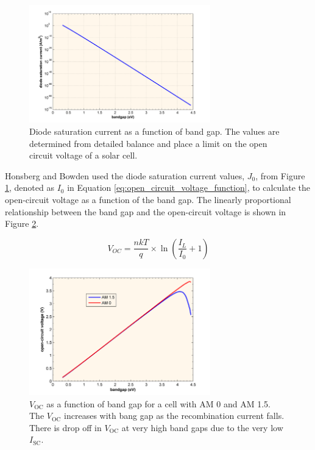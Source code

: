 \begin{figure}[ht]
    \centering
    \includegraphics[width=0.7\textwidth]{Figures/diode_saturation_current_bandgap_graph.png}
    \caption{Diode saturation current as a function of band gap. The values are determined from detailed balance and place a limit on the open circuit voltage of a solar cell. \cite{HonsbergOpen-CircuitVoltage}}
    \label{fig:diode_saturation_current_bandgap_graph}
\end{figure}
\FloatBarrier

Honsberg and Bowden used the diode saturation current values, $J_0$, from Figure \ref{fig:diode_saturation_current_bandgap_graph}, denoted as $I_0$ in Equation \ref{eq:open_circuit_voltage_function}, to calculate the open-circuit voltage as a function of the band gap. The linearly proportional relationship between the band gap and the open-circuit voltage is shown in Figure \ref{fig:open-circuit_voltage_bandgap_graph}.

\begin{equation}
    V_{OC} = \frac{n k T}{q} \times \ln\left(\frac{I_L}{I_0} + 1\right)
    \label{eq:open_circuit_voltage_function}
\end{equation}

\begin{figure}[ht]
    \centering
    \includegraphics[width=0.7\textwidth]{Figures/open-circuit_voltage_bandgap_graph.png}
    \caption{$V_\text{OC}$ as a function of band gap for a cell with AM 0 and AM 1.5. The $V_\text{OC}$ increases with bang gap as the recombination current falls. There is drop off in $V_\text{OC}$ at very high band gaps due to the very low $I_\text{SC}$. \cite{HonsbergOpen-CircuitVoltage}}
    \label{fig:open-circuit_voltage_bandgap_graph}
\end{figure}
\FloatBarrier

